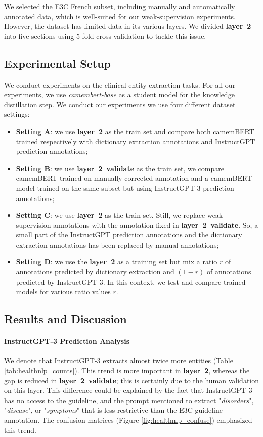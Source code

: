 We selected the E3C French subset, including manually and automatically annotated data, which is well-suited for our weak-supervision experiments. However, the dataset has limited data in its various layers. We divided \textbf{layer~2} into five sections using 5-fold cross-validation to tackle this issue.

\subsection{Experimental Setup} 
\label{sec:healthnlp_prot}
We conduct experiments on the clinical entity extraction tasks. For all our experiments, we use \textit{camembert-base} \citep{Martin2019CamemBERT:Model} as a student model for the knowledge distillation step.
We conduct our experiments we use four different dataset settings: 
\begin{itemize}
    \item \textbf{Setting A}: we use \textbf{layer~2} as the train set and compare both camemBERT trained respectively with dictionary extraction annotations and InstructGPT prediction annotations;
    \item \textbf{Setting B}: we use \textbf{layer~2~validate} as the train set, we compare camemBERT trained on manually corrected annotation and a camemBERT model trained on the same subset but using InstructGPT-3 prediction annotations;
    \item \textbf{Setting C}: we use \textbf{layer~2} as the train set. Still, we replace weak-supervision annotations with the annotation fixed in \textbf{layer~2~validate}. So, a small part of the InstructGPT prediction annotations and the dictionary extraction annotations has been replaced by manual annotations;
    \item \textbf{Setting D}: we use the \textbf{layer~2} as a training set but mix a ratio $r$ of annotations predicted by dictionary extraction and $(1-r)$ of annotations predicted by InstructGPT-3. In this context, we test and compare trained models for various ratio values $r$.
\end{itemize}

\subsection{Results and Discussion}
\paragraph{InstructGPT-3 Prediction Analysis} We denote that InstructGPT-3 extracts almost twice more entities (Table \ref{tab:healthnlp_counts}). This trend is more important in \textbf{layer~2}, whereas the gap is reduced in \textbf{layer~2~validate}; this is certainly due to the human validation on this layer. This difference could be explained by the fact that InstructGPT-3 has no access to the guideline, and the prompt mentioned to extract "\textit{disorders}", "\textit{disease}", or "\textit{symptoms}" that is less restrictive than the E3C guideline annotation. The confusion matrices (Figure \ref{fig:healthnlp_confuse}) emphasized this trend.

